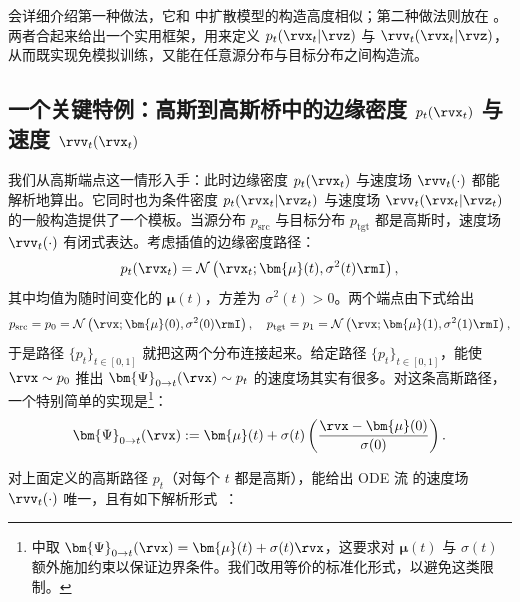  会详细介绍第一种做法，它和  中扩散模型的构造高度相似；第二种做法则放在 。两者合起来给出一个实用框架，用来定义 $p_t(\rvx_t| \rvz)$ 与 $\rvv_t(\rvx_t| \rvz)$，从而既实现免模拟训练，又能在任意源分布与目标分布之间构造流。


\subsection{一个关键特例：高斯到高斯桥中的边缘密度 $p_t(\rvx_t)$ 与速度 $\rvv_t(\rvx_t)$}\label{subsec:special-fm-instantiations}

我们从高斯端点这一情形入手：此时边缘密度 $p_t(\rvx_t)$ 与速度场 $\rvv_t(\cdot)$ 都能解析地算出。它同时也为条件密度 $p_t(\rvx_t |\rvz_t)$ 与速度场 $\rvv_t(\rvx_t |\rvz_t)$ 的一般构造提供了一个模板。当源分布 $p_{\text{src}}$ 与目标分布 $p_{\text{tgt}}$ 都是高斯时，速度场 $\rvv_t(\cdot)$ 有闭式表达。考虑插值的边缘密度路径：
\begin{align}\label{eq:gaussian-density-path}
    p_t(\rvx_t) = \mathcal{N}\left(\rvx_t; \bm{\mu}(t), \sigma^2(t) \rmI\right),
\end{align}
其中均值为随时间变化的 $\bm{\mu}(t)$，方差为 $\sigma^2(t)>0$。两个端点由下式给出
\[
p_{\text{src}} = p_0 =  \mathcal{N}\left(\rvx; \bm{\mu}(0), \sigma^2(0) \rmI\right), \quad
p_{\text{tgt}} = p_1 =  \mathcal{N}\left(\rvx; \bm{\mu}(1), \sigma^2(1) \rmI\right),
\]
于是路径 $\{p_t\}_{t \in [0,1]}$ 就把这两个分布连接起来。给定路径 $\{p_t\}_{t \in [0,1]}$，能使 $\rvx \sim p_0$ 推出 $\bm{\Psi}_{0\to t}(\rvx) \sim p_t$ 的速度场其实有很多。对这条高斯路径，一个特别简单的实现是\footnote{\citep{lipman2022flow} 中取 $\bm{\Psi}_{0\to t}(\rvx) = \bm{\mu}(t) + \sigma(t)\rvx$，这要求对 $\bm{\mu}(t)$ 与 $\sigma(t)$ 额外施加约束以保证边界条件。我们改用等价的标准化形式，以避免这类限制。}：
\begin{align}\label{eq:gaussian-sol-map}
    \bm{\Psi}_{0\to t}(\rvx) := \bm{\mu}(t) + \sigma(t) \left( \frac{\rvx - \bm{\mu}(0)}{\sigma(0)} \right).
\end{align}

对上面定义的高斯路径 $p_t$（对每个 $t$ 都是高斯），能给出 ODE 流  的速度场 $\rvv_t(\cdot)$ 唯一，且有如下解析形式~\citep{lipman2022flow}：

